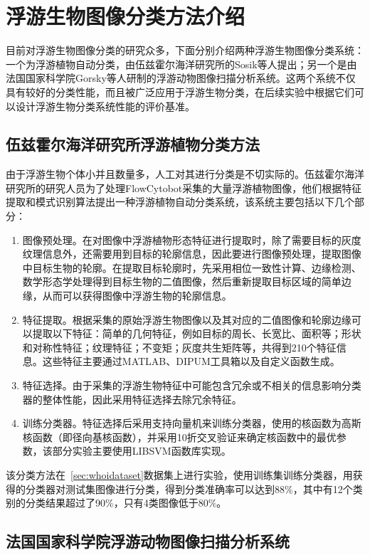 \section{浮游生物图像分类方法介绍}

目前对浮游生物图像分类的研究众多，下面分别介绍两种浮游生物图像分类系统：一个为浮游植物自动分类，由伍兹霍尔海洋研究所的Sosik等人提出；另一个是由法国国家科学院Gorsky等人研制的浮游动物图像扫描分析系统。这两个系统不仅具有较好的分类性能，而且被广泛应用于浮游生物分类，在后续实验中根据它们可以设计浮游生物分类系统性能的评价基准。

\subsection{伍兹霍尔海洋研究所浮游植物分类方法}

由于浮游生物个体小并且数量多，人工对其进行分类是不切实际的。伍兹霍尔海洋研究所的研究人员为了处理FlowCytobot采集的大量浮游植物图像，他们根据特征提取和模式识别算法提出一种浮游植物自动分类系统，该系统主要包括以下几个部分：

\begin{enumerate}
\item 图像预处理。在对图像中浮游植物形态特征进行提取时，除了需要目标的灰度纹理信息外，还需要用到目标的轮廓信息，因此要进行图像预处理，提取图像中目标生物的轮廓。在提取目标轮廓时，先采用相位一致性计算、边缘检测、数学形态学处理得到目标生物的二值图像，然后重新提取目标区域的简单边缘，从而可以获得图像中浮游生物的轮廓信息。
\item 特征提取。根据采集的原始浮游生物图像以及其对应的二值图像和轮廓边缘可以提取以下特征：简单的几何特征，例如目标的周长、长宽比、面积等；形状和对称性特征；纹理特征；不变矩；灰度共生矩阵等，共得到210个特征信息。这些特征主要通过MATLAB、DIPUM工具箱以及自定义函数生成。
\item 特征选择。由于采集的浮游生物特征中可能包含冗余或不相关的信息影响分类器的整体性能，因此采用特征选择去除冗余特征。
\item 训练分类器。特征选择后采用支持向量机来训练分类器，使用的核函数为高斯核函数（即径向基核函数），并采用10折交叉验证来确定核函数中的最优参数，该部分实验主要使用LIBSVM函数库实现。
\end{enumerate}

该分类方法在~\ref{sec:whoidataset}数据集上进行实验，使用训练集训练分类器，用获得的分类器对测试集图像进行分类，得到分类准确率可以达到88\%，其中有12个类别的分类结果超过了90\%，只有4类图像低于80\%。

\subsection{法国国家科学院浮游动物图像扫描分析系统}

